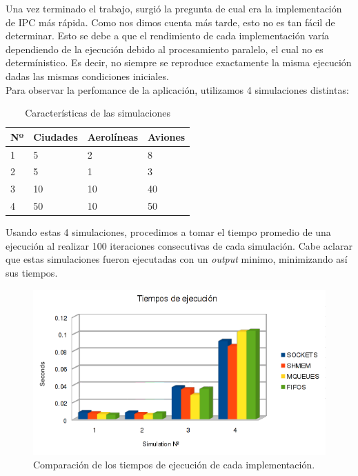 \documentclass[a4paper,10pt]{article}
\begin{document}
Una vez terminado el trabajo, surgió la pregunta de cual era la implementación de IPC más rápida. Como nos dimos cuenta más tarde, esto no es tan fácil de determinar. 
Esto se debe a que el rendimiento de cada implementación varía dependiendo de la ejecución debido al procesamiento paralelo, el cual no es determínistico. 
Es decir, no siempre se reproduce exactamente la misma ejecución dadas las mismas condiciones iniciales. \\

Para observar la perfomance de la aplicación, utilizamos 4 simulaciones distintas:

\begin{table}[H]
\begin{center}
\begin{tabular}{l|l|l|l}
Nº & Ciudades & Aerolíneas & Aviones \\
\hline
1 & 5 & 2 & 8 \\
2 & 5 & 1 & 3 \\
3 & 10 & 10 & 40 \\
4 & 50 & 10 & 50 \\
\end{tabular}
\caption{Características de las simulaciones}
\end{center}
\end{table}

Usando estas 4 simulaciones, procedimos a tomar el tiempo promedio de una ejecución al realizar 100 iteraciones consecutivas de cada simulación.
Cabe aclarar que estas simulaciones fueron ejecutadas con un \textit{output} minimo, minimizando así sus tiempos.

\begin{figure}[H]
\begin{center}
 \includegraphics[scale=0.75]{./images/runningTimesChart.png}
  \caption{Comparación de los tiempos de ejecución de cada implementación.}
\end{center}
\end{figure}
\end{document}
